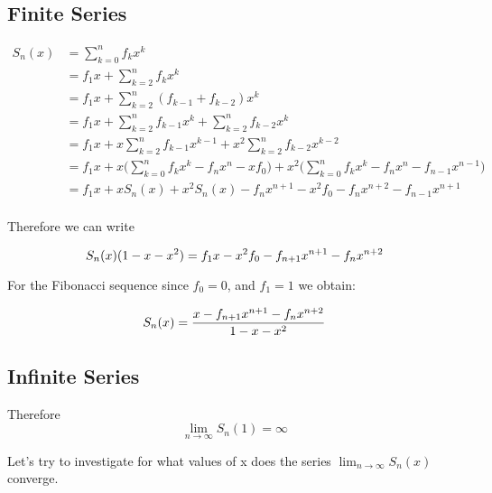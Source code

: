 \documentclass[a4paper]{article}
\begin{document}
\subsection{Finite Series}\label{subsec:finite-series}
\begin{equation}
\begin{split}
S_{n}(x) & = \sum_{k=0}^{n} f_k x^k \\
 & = f_1 x + \sum_{k=2}^{n} f_k x^k \\
 & = f_1 x + \sum_{k=2}^{n} (f_{k-1} + f_{k-2}) x^k \\
 & = f_1 x + \sum_{k=2}^{n} f_{k-1} x^k + \sum_{k=2}^{n} f_{k-2} x^k \\
  & = f_1 x + x \sum_{k=2}^{n} f_{k-1} x^{k-1} + x^2 \sum_{k=2}^{n} f_{k-2} x^{k-2} \\
  & = f_1 x + x \Big( \sum_{k=0}^{n} f_{k} x^{k} - f_n x^n  - x f_0 \Big) + x^2 \Big( \sum_{k=0}^{n} f_{k} x^{k} - f_n x^n - f_{n-1} x^{n-1} \Big) \\
  & = f_1 x + x S_{n}(x) + x^2 S_{n}(x) - f_{n}x^{n+1} - x^2 f_0 - f_n x^{n+2} - f_{n-1} x^{n+1}\\
\end{split}\label{eq:equation11}
\end{equation}

Therefore we can write

\begin{equation}
S_{n}(x) (1 - x -x^2 ) = f_1 x - x^2 f_0 - f_{n+1}x^{n+1} - f_n x^{n+2}\\
\label{eq:equation12}
\end{equation}

For the Fibonacci sequence since $f_0 = 0$, and  $f_1 = 1$ we obtain:

\begin{equation}
S_{n}(x) = \frac{x - f_{n+1}x^{n+1} - f_n x^{n+2}}{1 - x -x^2 }  \\
\label{eq:equation13}
\end{equation}


\subsection{Infinite Series}\label{subsec:infinite-series}
Therefore
\begin{equation}
\lim_{n \to \infty} S_n(1) = \infty
\label{eq:equation14}
\end{equation}

Let's try to investigate for what values of x does the series $\lim_{n \to \infty} S_n(x)$ converge.
\end{document}
